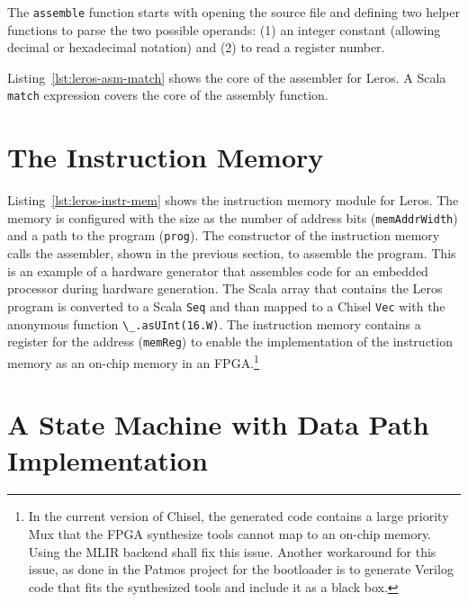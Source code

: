 \documentclass[%
    10pt,
    headinclude, footexclude,
    openright, %
    notitlepage,
    cleardoubleempty,
    headsepline,
    pointlessnumbers,
    bibtotoc, idxtotoc,
    ]{scrbook}
\newcommand{\code}[1]{{\lstinline[basicstyle=\small\ttfamily]{#1}}}
\newcommand{\todo}[1]{{\emph{TODO: #1}}}
\renewcommand{\todo}[1]{}
\begin{document}

The \code{assemble} function starts with opening the source file
and defining two helper functions to parse the two possible operands: (1) an
integer constant (allowing decimal or hexadecimal notation) and (2) to read
a register number.


Listing~\ref{lst:leros-asm-match} shows the core of the assembler for Leros.
A Scala \code{match} expression covers the core of the assembly function.
\todo{Some more words on the code.}




\section{The Instruction Memory}

Listing~\ref{lst:leros-instr-mem} shows the instruction memory module for Leros.
The memory is configured with the size as the number of address bits (\code{memAddrWidth}) and
a path to the program (\code{prog}). The constructor of the instruction memory calls the
assembler, shown in the previous section, to assemble the program.
This is an example of a hardware generator that assembles code for an
embedded processor during hardware generation.
The Scala array that contains the Leros program is converted to a Scala
\code{Seq} and than mapped to a Chisel \code{Vec} with the anonymous
function \code{\_.asUInt(16.W)}.
The instruction memory contains a register for the address (\code{memReg})
to enable the implementation of the instruction memory as an on-chip memory
in an FPGA.\footnote{In the current version of Chisel, the generated code
contains a large priority Mux that the FPGA synthesize tools cannot map to
an on-chip memory. Using the MLIR backend shall fix this issue.
Another workaround for this issue, as done in the Patmos project for the
bootloader is to generate Verilog code that fits the synthesized tools
and include it as a black box.}



\section{A State Machine with Data Path Implementation}
\end{document}
